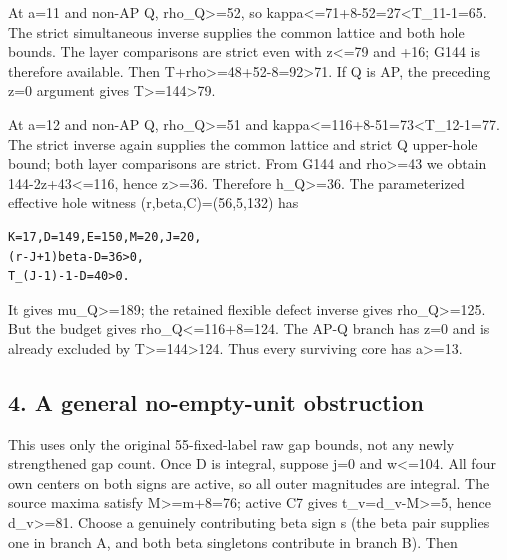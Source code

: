 \documentclass[10pt,a4paper]{article}
\theoremstyle{definition}
\begin{document}
At a=\allowbreak{}11 and non-AP Q,\allowbreak{} rho\_\allowbreak{}Q\textgreater=\allowbreak{}52,\allowbreak{} so
kappa\textless=\allowbreak{}71+\allowbreak{}8-52=\allowbreak{}27\textless T\_\allowbreak{}11-1=\allowbreak{}65. The strict simultaneous
inverse supplies the common lattice and both hole bounds. The layer
comparisons are strict even with z\textless=\allowbreak{}79 and +\allowbreak{}16; G144 is
therefore available. Then T+\allowbreak{}rho\textgreater=\allowbreak{}48+\allowbreak{}52-8=\allowbreak{}92\textgreater71. If
Q is AP,\allowbreak{} the preceding z=\allowbreak{}0 argument gives
T\textgreater=\allowbreak{}144\textgreater79.

At a=\allowbreak{}12 and non-AP Q,\allowbreak{} rho\_\allowbreak{}Q\textgreater=\allowbreak{}51 and
kappa\textless=\allowbreak{}116+\allowbreak{}8-51=\allowbreak{}73\textless T\_\allowbreak{}12-1=\allowbreak{}77. The strict inverse again
supplies the common lattice and strict Q upper-hole bound; both layer
comparisons are strict. From G144 and rho\textgreater=\allowbreak{}43 we obtain
144-2z+\allowbreak{}43\textless=\allowbreak{}116,\allowbreak{} hence z\textgreater=\allowbreak{}36. Therefore
h\_\allowbreak{}Q\textgreater=\allowbreak{}36. The parameterized effective hole witness
(r,\allowbreak{}beta,\allowbreak{}C)=\allowbreak{}(56,\allowbreak{}5,\allowbreak{}132) has

\begin{lstlisting}
K=17,D=149,E=150,M=20,J=20,
(r-J+1)beta-D=36>0,
T_(J-1)-1-D=40>0.
\end{lstlisting}

It gives mu\_\allowbreak{}Q\textgreater=\allowbreak{}189; the retained flexible defect inverse
gives rho\_\allowbreak{}Q\textgreater=\allowbreak{}125. But the budget gives
rho\_\allowbreak{}Q\textless=\allowbreak{}116+\allowbreak{}8=\allowbreak{}124. The AP-Q branch has z=\allowbreak{}0 and is already
excluded by T\textgreater=\allowbreak{}144\textgreater124. Thus every surviving core
has a\textgreater=\allowbreak{}13.

\hypertarget{a-general-no-empty-unit-obstruction}{%
\subsection{4. A general no-empty-unit
obstruction}\label{a-general-no-empty-unit-obstruction}}

This uses only the original 55-fixed-label raw gap bounds,\allowbreak{} not any newly
strengthened gap count. Once D is integral,\allowbreak{} suppose j=\allowbreak{}0 and
w\textless=\allowbreak{}104. All four own centers on both signs are active,\allowbreak{} so all
outer magnitudes are integral. The source maxima satisfy
M\textgreater=\allowbreak{}m+\allowbreak{}8=\allowbreak{}76; active C7 gives t\_\allowbreak{}v=\allowbreak{}d\_\allowbreak{}v-M\textgreater=\allowbreak{}5,\allowbreak{} hence
d\_\allowbreak{}v\textgreater=\allowbreak{}81. Choose a genuinely contributing beta sign s (the
beta pair supplies one in branch A,\allowbreak{} and both beta singletons contribute
in branch B). Then
\end{document}
